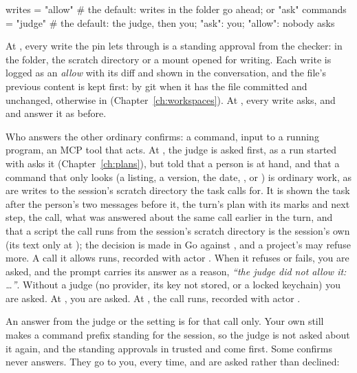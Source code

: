 \begin{toml}
[approval]
writes = "allow"     # the default: writes in the folder go ahead; or "ask"
commands = "judge"   # the default: the judge, then you; "ask": you; "allow": nobody asks
\end{toml}

\begin{description}[leftmargin=1.2em,labelindent=0pt]
  \item[writes] At , every write the pin lets through is a
    standing approval from the  checker: in the folder,
    the scratch directory or a mount opened for writing. Each write is
    logged as an \emph{allow} with its diff and shown in the conversation,
    and the file's previous content is kept first: by git when it has the
    file committed and unchanged, otherwise in 
    (Chapter~\ref{ch:workspaces}). At , every write asks, and
     and  answer it as before.
  \item[commands] Who answers the other ordinary confirms: a command,
    input to a running program, an MCP tool that acts. At ,
    the judge is asked first, as a run started with  asks
    it (Chapter~\ref{ch:plans}), but told that a person is at hand, and
    that a command that only looks (a listing, a version, the date,
    ,  or ) is ordinary work, as are
    writes to the session's scratch directory the task calls for. It is
    shown the task after the person's two messages before it, the turn's
    plan with its marks and next step, the call,
    what was answered about the same call earlier in the turn, and that a
    script the call runs from the session's scratch directory is the
    session's own (its text only at ); the decision is made in Go
    against
    , and a project's
     may refuse more. A call it allows runs,
    recorded with actor . When it refuses or fails, you are
    asked, and the prompt carries its answer as a reason, \emph{``the judge
    did not allow it: \ldots''}. Without a judge (no \code{[judge]} provider,
    its key not stored,  or a locked keychain)
    you are asked. At
    , you are asked. At , the call runs, recorded
    with actor .
\end{description}

An answer from the judge or the setting is for that call only. Your own
 still makes a command prefix standing for the session, so the
judge is not asked about it again, and the standing approvals in
trusted  and  come first.
Some confirms \code{[approval]} never answers. They go to you, every time,
and are asked rather than declined:

